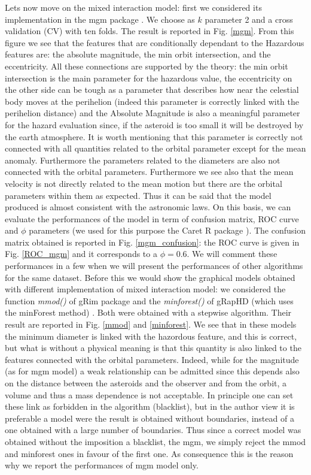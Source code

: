 \documentclass[12pt,%
               a4paper,%
               oneside,openany,%
               titlepage,%
               headinclude,footinclude,%
               BCOR5mm,%
               cleardoublepage=empty,%
               tablecaptionabove,%
               floatperchapter,
               ]{scrreprt}                 %
\begin{document}
Lets now move on the mixed interaction model: first we considered its implementation in the mgm package \cite{mgm,haslbeck2015mgm}. We choose as $k$ parameter 2 and a cross validation (CV) with ten folds. The result is reported in Fig. \ref{mgm}. From this figure we see that the features that are conditionally dependant to the Hazardous features are: the absolute magnitude, the min orbit intersection, and the eccentricity.  All these connections are supported by the theory: the min orbit intersection is the main parameter for the hazardous value, the eccentricity on the other side can be tough as a parameter that describes how near the celestial body moves at the perihelion (indeed this parameter is correctly linked with the perihelion distance) and the Absolute Magnitude is also a meaningful parameter for the hazard evaluation since, if the asteroid is too small it will be destroyed by the earth atmosphere. It is worth mentioning that this parameter is correctly not connected with all quantities related to the orbital parameter except for the mean anomaly. Furthermore the parameters related to the diameters are also not connected with the orbital parameters. Furthermore we see also that the mean velocity is not directly related to the mean motion but there are the orbital parameters within them as expected. Thus it can be said that the model produced is almost consistent with the astronomic laws. On this basis, we can evaluate the performances of the model in term of confusion matrix, ROC curve and $\phi$ parameters (we used for this purpose the Caret R package \cite{kuhn2008building,caret}). The confusion matrix obtained is reported in Fig. \ref{mgm_confusion}: the ROC curve is given in Fig. \ref{ROC_mgm} and it corresponds to a $\phi=0.6$. We will comment these performances in a few when we will present the performances of other algorithms for the same dataset. Before this we would show the graphical models obtained with different implementation of mixed interaction model: we considered the function \textit{mmod()} of gRim package \cite{hojsgaard2012graphical} and the \textit{minforest()} of gRapHD (which uses the minForest method) \cite{de2009high}. Both were obtained with a stepwise algorithm.  Their result are reported in Fig. \ref{mmod} and \ref{minforest}. We see that in these models the minimum diameter is linked with the hazordous feature, and this is correct, but what is without a physical meaning is that this quantity is also linked to the features connected with the orbital parameters. Indeed, while for the magnitude (as for mgm model) a weak relationship can be admitted since this depends also on the distance between the asteroids and the observer and from the orbit, a volume and thus a mass dependence is not acceptable. In principle one can set these link as forbidden in the algorithm (blacklist), but in the author view it is preferable a model were the result is obtained without boundaries, instead of a one obtained with a large number of boundaries. Thus since a correct model was obtained without the imposition a blacklist, the mgm, we simply reject the mmod and minforest ones in favour of the first one. As consequence this is the reason why we report the performances of mgm model only. 
\end{document}
